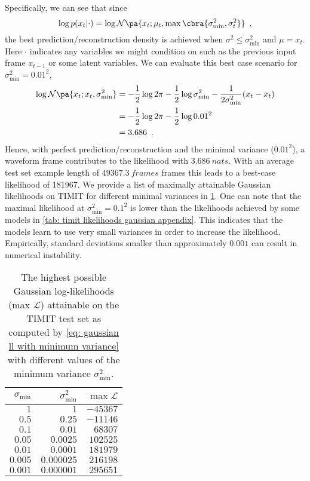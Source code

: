 {Specifically, we can see that since
\begin{equation}
    \log p(x_t|\cdot) = \log \mathcal{N}\pa{x_t; \mu_t, \max\cbra{\sigma_\text{min}^2, \sigma_t^2}}\enspace \label{eq: gaussian ll with minimum variance} ,
\end{equation}
the best prediction/reconstruction density is achieved when $\sigma^2 \leq \sigma_\text{min}^2$ and $\mu=x_t$. 
Here $\cdot$ indicates any variables we might condition on such as the previous input frame $x_{t-1}$ or some latent variables.
We can evaluate this best case scenario for $\sigma_\text{min}^2 = 0.01^2$,
\begin{align}
    \log \mathcal{N}\pa{x_t; x_t, \sigma_\text{min}^2} &= -\frac{1}{2}\log 2\pi - \frac{1}{2}\log \sigma_\text{min}^2 - \frac{1}{2\sigma_\text{min}^2} (x_t - x_t) \nonumber \\
    &= -\frac{1}{2}\log 2\pi - \frac{1}{2}\log 0.01^2 \nonumber \\
    &= 3.686 \enspace . 
\end{align}
Hence, with perfect prediction/reconstruction and the minimal variance ($0.01^2$), a waveform frame contributes to the likelihood with $\SI{3.686}{nats}$. With an average test set example length of $\SI{49367.3}{frames}$ frames this leads to a best-case likelihood of 181967. We provide a list of maximally attainable Gaussian likelihoods on TIMIT for different minimal variances in \cref{tab:timit best gaussian ll}. One can note that the maximal likelihood at $\sigma_\text{min}^2=0.1^2$ is lower than the likelihoods achieved by some models in \cref{tab: timit likelihoods gaussian appendix}. This indicates that the models learn to use very small variances in order to increase the likelihood. Empirically, standard deviations smaller than approximately $0.001$ can result in numerical instability.


\begin{table}[t!]
    \caption{The highest possible Gaussian log-likelihoods (max $\mathcal{L}$) attainable on the TIMIT test set as computed by \eqref{eq: gaussian ll with minimum variance} with different values of the minimum variance $\sigma^2_\text{min}$.}
    \centering
    \begin{tabular}{rrr}
    \toprule
    $\sigma_\text{min}$ & $\sigma_\text{min}^2$ & $\max\mathcal{L}$ \\
    \midrule
    $1$      & $1$           &    $-45367$ \\
    $0.5$    & $0.25$        &    $-11146$ \\
    $0.1$    & $0.01$        &     $68307$ \\
    $0.05$   & $0.0025$      &    $102525$ \\
    $0.01$   & $0.0001$      &    $181979$ \\
    $0.005$  & $0.000025$    &    $216198$ \\
    $0.001$  & $0.000001$    &    $295651$ \\
    \bottomrule
    \end{tabular}
    \label{tab:timit best gaussian ll}
\end{table}




}
